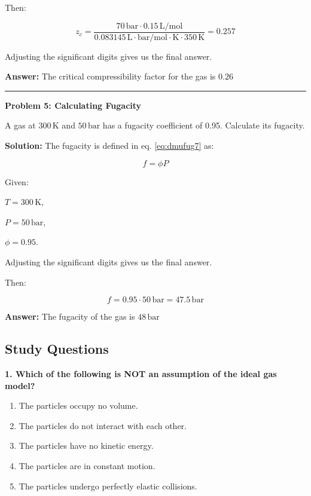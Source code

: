\documentclass[
  9pt,
]{extbook}
\providecommand{\tightlist}{%
  \setlength{\itemsep}{0pt}\setlength{\parskip}{0pt}}
\theoremstyle{definition}
\theoremstyle{definition}
\theoremstyle{definition}
\theoremstyle{definition}
\theoremstyle{remark}
\begin{document}
Then:

\[z_c = \frac{70\,\text{bar} \cdot 0.15\,\text{L}/\text{mol}}{0.083145\,\text{L}\cdot\text{bar}/\text{mol}\cdot\text{K} \cdot 350\,\text{K}}=0.257\]

Adjusting the significant digits gives us the final answer.

\textbf{Answer:} The critical compressibility factor for the gas is \(0.26\)

\begin{center}\rule{0.5\linewidth}{0.5pt}\end{center}

\textbf{Problem 5: Calculating Fugacity}

A gas at \(300\,\text{K}\) and \(50\,\text{bar}\) has a fugacity coefficient of 0.95. Calculate its fugacity.

\textbf{Solution:} The fugacity is defined in eq. \eqref{eq:dmufug7} as:

\[f = \phi P\]

Given:

\(T = 300\,\text{K}\),

\(P = 50\,\text{bar}\),

\(\phi = 0.95\).

Adjusting the significant digits gives us the final answer.

Then:

\[f = 0.95 \cdot 50\,\text{bar}=47.5\,\text{bar}\]

\textbf{Answer:} The fugacity of the gas is \(48\,\text{bar}\)

\subsection{Study Questions}\label{quest11}

\textbf{1. Which of the following is NOT an assumption of the ideal gas model?}

\begin{enumerate}
\def\labelenumi{\alph{enumi}.}
\tightlist
\item
  The particles occupy no volume.
\item
  The particles do not interact with each other.
\item
  The particles have no kinetic energy.
\item
  The particles are in constant motion.
\item
  The particles undergo perfectly elastic collisions.
\end{enumerate}
\end{document}
